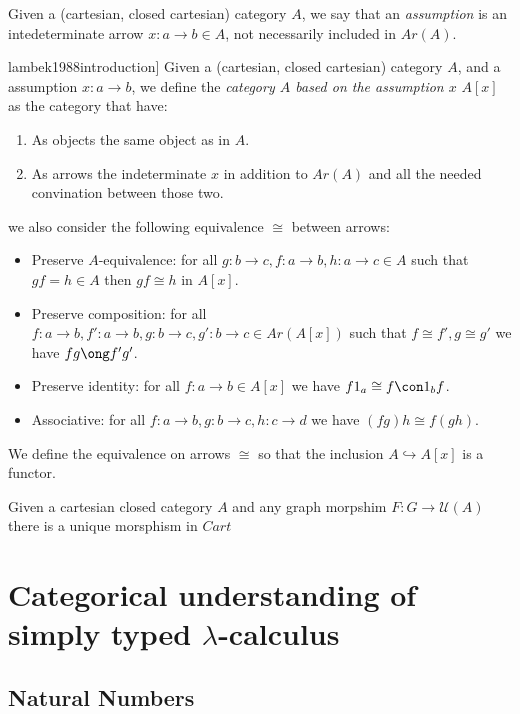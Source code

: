 \begin{definition}
Given a (cartesian, closed cartesian) category $A$, we say that an \emph{assumption} is an intedeterminate arrow $x: a \to b \in A$, not necessarily included in $Ar(A)$. 
\end{definition}
\begin{definition}[\cite[Section 5]{lambek1988introduction}]
  Given a (cartesian, closed cartesian) category $A$, and a assumption $x: a \to b$, we define the \emph{category $A$ based on the assumption $x$} $A[x]$ as the category that have:
  \begin{enumerate}
  \item As objects the same object as in $A$.
  \item As arrows the indeterminate $x$ in addition to $Ar(A)$ and all the needed convination between those two.
  \end{enumerate}
  we also consider the following equivalence $\cong$ between arrows:
  \begin{itemize}
  \item Preserve $A$-equivalence: for all $g:b\to c,f:a\to b, h: a\to c\in A$ such that $gf=h \in A$ then $gf \cong h$ in $A[x]$.
  \item Preserve composition: for all $f:a\to b,f':a\to b,g:b\to c,g': b \to c\in Ar(A[x])$ such that $f\cong f', g\cong g'$ we have $fg\ong f'g'$.
  \item Preserve identity: for all $f:a\to b\in A[x]$ we have $f1_a\cong f \con 1_bf$.
  \item Associative: for all $f:a\to b, g:b\to c, h: c\to d$ we have $(fg)h\cong f(gh)$.
  \end{itemize}
\end{definition}
\begin{remark}
We define the equivalence on arrows $\cong$ so that the inclusion $A\hookrightarrow A[x]$ is a functor.
\end{remark}

\begin{proposition}
  Given a cartesian closed category $A$ and any graph morpshim $F: G \to \mathcal U(A)$ there is a unique morsphism in $Cart$  
\end{proposition}

\section{Categorical understanding of simply typed $\lambda$-calculus}
\subsection{Natural Numbers}


